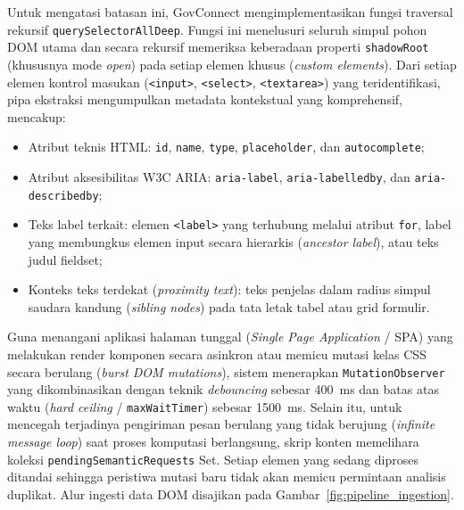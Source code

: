 \documentclass[conference]{IEEEtran}
\begin{document}
Untuk mengatasi batasan ini, GovConnect mengimplementasikan fungsi traversal rekursif \texttt{querySelectorAllDeep}. Fungsi ini menelusuri seluruh simpul pohon DOM utama dan secara rekursif memeriksa keberadaan properti \texttt{shadowRoot} (khususnya mode \textit{open}) pada setiap elemen khusus (\textit{custom elements}). Dari setiap elemen kontrol masukan (\texttt{<input>}, \texttt{<select>}, \texttt{<textarea>}) yang teridentifikasi, pipa ekstraksi mengumpulkan metadata kontekstual yang komprehensif, mencakup:
\begin{itemize}[leftmargin=*]
    \item Atribut teknis HTML: \texttt{id}, \texttt{name}, \texttt{type}, \texttt{placeholder}, dan \texttt{autocomplete};
    \item Atribut aksesibilitas W3C ARIA: \texttt{aria-label}, \texttt{aria-labelledby}, dan \texttt{aria-describedby};
    \item Teks label terkait: elemen \texttt{<label>} yang terhubung melalui atribut \texttt{for}, label yang membungkus elemen input secara hierarkis (\textit{ancestor label}), atau teks judul fieldset;
    \item Konteks teks terdekat (\textit{proximity text}): teks penjelas dalam radius simpul saudara kandung (\textit{sibling nodes}) pada tata letak tabel atau grid formulir.
\end{itemize}

Guna menangani aplikasi halaman tunggal (\textit{Single Page Application} / SPA) yang melakukan render komponen secara asinkron atau memicu mutasi kelas CSS secara berulang (\textit{burst DOM mutations}), sistem menerapkan \texttt{MutationObserver} yang dikombinasikan dengan teknik \textit{debouncing} sebesar 400~ms dan batas atas waktu (\textit{hard ceiling} / \texttt{maxWaitTimer}) sebesar 1500~ms. Selain itu, untuk mencegah terjadinya pengiriman pesan berulang yang tidak berujung (\textit{infinite message loop}) saat proses komputasi berlangsung, skrip konten memelihara koleksi \texttt{pendingSemanticRequests} Set. Setiap elemen yang sedang diproses ditandai sehingga peristiwa mutasi baru tidak akan memicu permintaan analisis duplikat. Alur ingesti data DOM disajikan pada Gambar~\ref{fig:pipeline_ingestion}.
\end{document}
